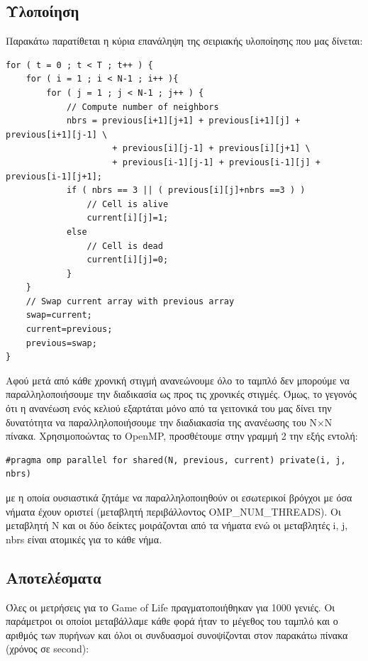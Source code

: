 \documentclass{article}
\begin{document}
\subsection{Υλοποίηση}

Παρακάτω παρατίθεται η κύρια επανάληψη της σειριακής υλοποίησης που μας δίνεται:

\begin{lstlisting}[style=CStyle]
for ( t = 0 ; t < T ; t++ ) {
	for ( i = 1 ; i < N-1 ; i++ ){
    	for ( j = 1 ; j < N-1 ; j++ ) {
    		// Compute number of neighbors
        	nbrs = previous[i+1][j+1] + previous[i+1][j] + previous[i+1][j-1] \
                     + previous[i][j-1] + previous[i][j+1] \
                     + previous[i-1][j-1] + previous[i-1][j] + previous[i-1][j+1];
            if ( nbrs == 3 || ( previous[i][j]+nbrs ==3 ) )
            	// Cell is alive
            	current[i][j]=1;
            else
            	// Cell is dead
                current[i][j]=0;
           	}
	}
	// Swap current array with previous array
    swap=current;
    current=previous;
    previous=swap;
}
\end{lstlisting}

Αφού μετά από κάθε χρονική στιγμή ανανεώνουμε όλο το ταμπλό δεν μπορούμε να παραλληλοποιήσουμε την διαδικασία ως προς τις χρονικές στιγμές. Όμως, το γεγονός ότι η ανανέωση ενός κελιού εξαρτάται μόνο από τα γειτονικά του μας δίνει την δυνατότητα να παραλληλοποιήσουμε την διαδιακασία της ανανέωσης του N×N πίνακα. Χρησιμοποώντας το OpenMP, προσθέτουμε στην γραμμή 2 την εξής εντολή:

\begin{lstlisting}[style=CStyle]
#pragma omp parallel for shared(N, previous, current) private(i, j, nbrs)
\end{lstlisting}

με η οποία ουσιαστικά ζητάμε να παραλληλοποιηθούν οι εσωτερικοί βρόγχοι με όσα νήματα έχουν οριστεί (μεταβλητή περιβάλλοντος OMP\_NUM\_THREADS). Οι μεταβλητή N και οι δύο δείκτες μοιράζονται από τα νήματα ενώ οι μεταβλητές i, j, nbrs είναι ατομικές για το κάθε νήμα.

\subsection{Αποτελέσματα}

Όλες οι μετρήσεις για το Game of Life πραγματοποιήθηκαν για 1000 γενιές. Οι παράμετροι οι οποίοι μεταβάλλαμε κάθε φορά ήταν το μέγεθος του ταμπλό και ο αριθμός των πυρήνων και όλοι οι συνδυασμοί συνοψίζονται στον παρακάτω πίνακα (χρόνος σε second):
\end{document}

